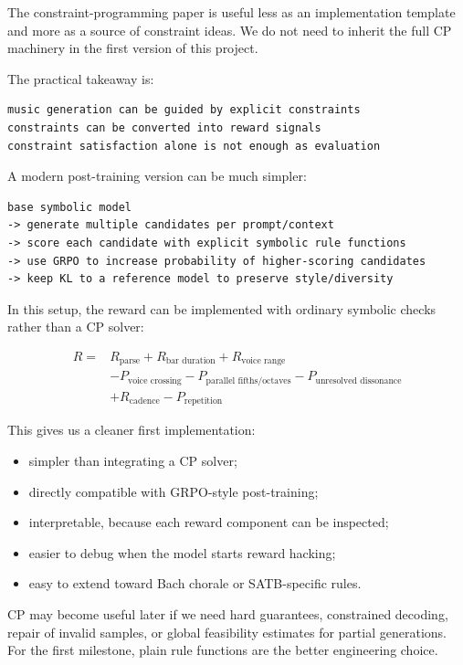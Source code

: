 \documentclass[11pt]{article}
\begin{document}
The constraint-programming paper is useful less as an implementation template and
more as a source of constraint ideas. We do not need to inherit the full CP
machinery in the first version of this project.

The practical takeaway is:

\begin{verbatim}
music generation can be guided by explicit constraints
constraints can be converted into reward signals
constraint satisfaction alone is not enough as evaluation
\end{verbatim}

A modern post-training version can be much simpler:

\begin{verbatim}
base symbolic model
-> generate multiple candidates per prompt/context
-> score each candidate with explicit symbolic rule functions
-> use GRPO to increase probability of higher-scoring candidates
-> keep KL to a reference model to preserve style/diversity
\end{verbatim}

In this setup, the reward can be implemented with ordinary symbolic checks rather
than a CP solver:

\[
\begin{aligned}
R ={}& R_{\text{parse}}
+ R_{\text{bar duration}}
+ R_{\text{voice range}} \\
&- P_{\text{voice crossing}}
- P_{\text{parallel fifths/octaves}}
- P_{\text{unresolved dissonance}} \\
&+ R_{\text{cadence}}
- P_{\text{repetition}}
\end{aligned}
\]

This gives us a cleaner first implementation:

\begin{itemize}[leftmargin=*]
  \item simpler than integrating a CP solver;
  \item directly compatible with GRPO-style post-training;
  \item interpretable, because each reward component can be inspected;
  \item easier to debug when the model starts reward hacking;
  \item easy to extend toward Bach chorale or SATB-specific rules.
\end{itemize}

CP may become useful later if we need hard guarantees, constrained decoding,
repair of invalid samples, or global feasibility estimates for partial
generations. For the first milestone, plain rule functions are the better
engineering choice.
\end{document}

